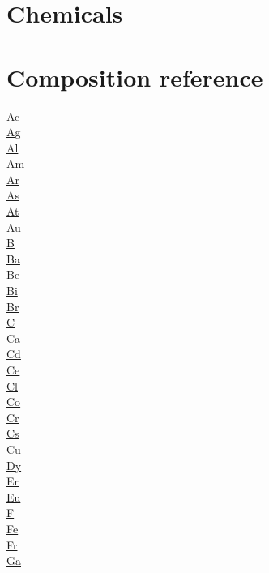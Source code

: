 \documentclass{book}
\begin{document}
\chapter{Chemicals}

\chapter{Composition reference}
\begin{multicols}{3}
\noindent
\hyperref[sec:elem-actinium]{Ac}\\
\hyperref[sec:elem-silver]{Ag}\\
\hyperref[sec:elem-aluminium]{Al}\\
\hyperref[sec:elem-americium]{Am}\\
\hyperref[sec:elem-argon]{Ar}\\
\hyperref[sec:elem-arsenic]{As}\\
\hyperref[sec:elem-astatine]{At}\\
\hyperref[sec:elem-gold]{Au}\\
\hyperref[sec:elem-boron]{B}\\
\hyperref[sec:elem-barium]{Ba}\\
\hyperref[sec:elem-beryllium]{Be}\\
\hyperref[sec:elem-bismuth]{Bi}\\
\hyperref[sec:elem-bromine]{Br}\\
\hyperref[sec:elem-carbon]{C}\\
\hyperref[sec:elem-calcium]{Ca}\\
\hyperref[sec:elem-cadmium]{Cd}\\
\hyperref[sec:elem-cerium]{Ce}\\
\hyperref[sec:elem-chlorine]{Cl}\\
\hyperref[sec:elem-cobalt]{Co}\\
\hyperref[sec:elem-chromium]{Cr}\\
\hyperref[sec:elem-caesium]{Cs}\\
\hyperref[sec:elem-copper]{Cu}\\
\hyperref[sec:elem-dysprosium]{Dy}\\
\hyperref[sec:elem-erbium]{Er}\\
\hyperref[sec:elem-europium]{Eu}\\
\hyperref[sec:elem-fluorine]{F}\\
\hyperref[sec:elem-iron]{Fe}\\
\hyperref[sec:elem-francium]{Fr}\\
\hyperref[sec:elem-gallium]{Ga}\\

\end{multicols}
\end{document}
